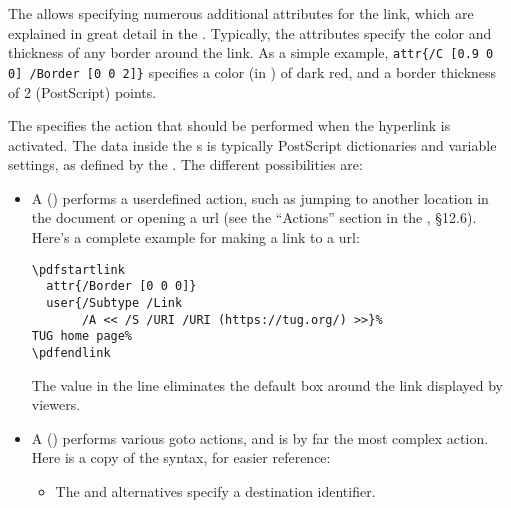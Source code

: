 \documentclass{pdftexmanual}
\begin{document}
The  allows specifying numerous additional
attributes for the link, which are explained in great detail in the
\PDFReference. Typically, the attributes specify the color and thickness
of any border around the link. As a simple example,
\verb|attr{/C [0.9 0 0] /Border [0 0 2]}|
specifies a color (in \RGB) of dark red, and a border thickness of 2
(PostScript) points.

The  specifies the action that should be
performed when the hyperlink is activated. The data inside the
s is typically PostScript dictionaries and
variable settings, as defined by the \PDFReference. The different
 possibilities are:

\begin{itemize}
\item A  () performs a
user\hyph defined action, such as jumping to another
location in the document or opening a url (see the ``Actions'' section
in the \PDFReference, \S12.6). Here's a complete example for making a
link to a url:
\begin{verbatim}
\pdfstartlink
  attr{/Border [0 0 0]}
  user{/Subtype /Link
       /A << /S /URI /URI (https://tug.org/) >>}%
TUG home page%
\pdfendlink
\end{verbatim}

\noindent The  value in the  line eliminates
the default box around the link displayed by viewers.

\item A  () performs various
goto actions, and is by far the most complex action. Here is a copy of
the syntax, for easier reference:


\begin{itemize}
\item The  and  alternatives specify a
destination identifier.


\end{itemize}
\end{itemize}
\end{document}
